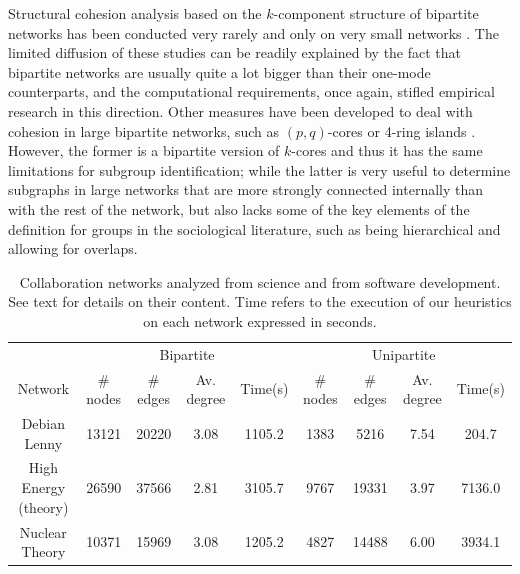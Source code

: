 Structural cohesion analysis based on the $k$-component structure of bipartite networks has been conducted very rarely and only on very small networks \citep{white:2004}. The limited diffusion of these studies can be readily explained by the fact that bipartite networks are usually quite a lot bigger than their one-mode counterparts, and the computational requirements, once again, stifled empirical research in this direction. Other measures have been developed to deal with cohesion in large bipartite networks, such as $(p, q)$-cores or 4-ring islands \citep{ahmed:2007}. However, the former is a bipartite version of $k$-cores and thus it has the same limitations for subgroup identification; while the latter is very useful to determine subgraphs in large networks that are more strongly connected internally than with the rest of the network, but also lacks some of the key elements of the definition for groups in the sociological literature, such as being hierarchical and allowing for overlaps.

\begin{table}[h]
\begin{center}
\begin{small}
\begin{tabular}{|c|c|c|c|c|c|c|c|c|}
\hline
&\multicolumn{4}{|c|}{Bipartite}&\multicolumn{4}{|c|}{Unipartite}\\
Network&\# nodes&\# edges&Av. degree&Time(s)&\# nodes&\# edges&Av. degree&Time(s)\\
\hline
Debian Lenny&13121&20220&3.08&1105.2&1383&5216&7.54&204.7\\
High Energy (theory)&26590&37566&2.81&3105.7&9767&19331&3.97&7136.0\\
Nuclear Theory&10371&15969&3.08&1205.2&4827&14488&6.00&3934.1\\
\hline
\end{tabular}
\end{small}
\caption[Example collaboration networks description.]{Collaboration networks analyzed from science and from software development. See text for details on their content. Time refers to the execution of our heuristics on each network expressed in seconds.}
\label{desc}
\end{center}
\end{table}

